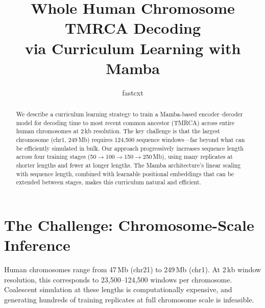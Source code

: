 \documentclass[11pt,a4paper]{article}
\title{\textbf{Whole Human Chromosome TMRCA Decoding\\via Curriculum Learning with Mamba}}
\author{fastcxt}
\date{}
\begin{document}
\maketitle

\begin{abstract}
We describe a curriculum learning strategy to train a Mamba-based encoder--decoder model for decoding time to most recent common ancestor (TMRCA) across entire human chromosomes at 2\,kb resolution. The key challenge is that the largest chromosome (chr1, 249\,Mb) requires 124,500 sequence windows---far beyond what can be efficiently simulated in bulk. Our approach progressively increases sequence length across four training stages (50$\to$100$\to$150$\to$250\,Mb), using many replicates at shorter lengths and fewer at longer lengths. The Mamba architecture's linear scaling with sequence length, combined with learnable positional embeddings that can be extended between stages, makes this curriculum natural and efficient.
\end{abstract}

\section{The Challenge: Chromosome-Scale Inference}

Human chromosomes range from 47\,Mb (chr21) to 249\,Mb (chr1). At 2\,kb window resolution, this corresponds to 23,500--124,500 windows per chromosome. Coalescent simulation at these lengths is computationally expensive, and generating hundreds of training replicates at full chromosome scale is infeasible.
\end{document}
